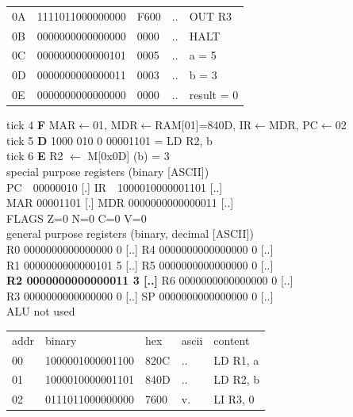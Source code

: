 \begin{tcolorbox}[stepbox, title={Instruction 1 \hfill ticks 1 to 3 \quad LD R1, a}]
{\begin{tabular}{@{}lllll@{}}
0A & 1111011000000000 & F600 & .. & OUT R3\\
0B & 0000000000000000 & 0000 & .. & HALT\\
\rowcolor{datac}0C & 0000000000000101 & 0005 & .. & a = 5\\
\rowcolor{datac}0D & 0000000000000011 & 0003 & .. & b = 3\\
\rowcolor{datac}0E & 0000000000000000 & 0000 & .. & result = 0\\
\end{tabular}}
\end{tcolorbox}\hfill\begin{tcolorbox}[stepbox, title={Instruction 2 \hfill ticks 4 to 6 \quad LD R2, b}]
\textcolor{dim}{tick 4} \textbf{F} MAR$\leftarrow$01, MDR$\leftarrow$RAM[01]=840D, IR$\leftarrow$MDR, PC$\leftarrow$02\\
\textcolor{dim}{tick 5} \textbf{D} 1000 010 0 00001101 = LD R2, b\\
\textcolor{dim}{tick 6} \textbf{E} R2 $\leftarrow$ M[0x0D] (b) = 3\\[2pt]
\textcolor{dim}{special purpose registers (binary [ASCII])}\\
PC~~00000010 [.] \hfill IR~~1000010000001101 [..]\\
MAR 00001101 [.] \hfill MDR 0000000000000011 [..]\\
FLAGS Z=0 N=0 C=0 V=0\\[2pt]
\textcolor{dim}{general purpose registers (binary, decimal [ASCII])}\\
R0 0000000000000000 0 [..] \hfill R4 0000000000000000 0 [..]\\
R1 0000000000000101 5 [..] \hfill R5 0000000000000000 0 [..]\\
\textcolor{wrt}{\textbf{R2 0000000000000011 3 [..]}} \hfill R6 0000000000000000 0 [..]\\
R3 0000000000000000 0 [..] \hfill SP 0000000000000000 0 [..]\\
\textcolor{dim}{ALU not used}\\[2pt]
{\setlength{\tabcolsep}{2pt}\begin{tabular}{@{}lllll@{}}
\textcolor{dim}{addr} & \textcolor{dim}{binary} & \textcolor{dim}{hex} & \textcolor{dim}{ascii} & \textcolor{dim}{content}\\
00 & 1000001000001100 & 820C & .. & LD R1, a\\
01 & 1000010000001101 & 840D & .. & LD R2, b\\
\rowcolor{pcc}02 & 0111011000000000 & 7600 & v. & LI R3, 0\\

\end{tabular}}
\end{tcolorbox}
